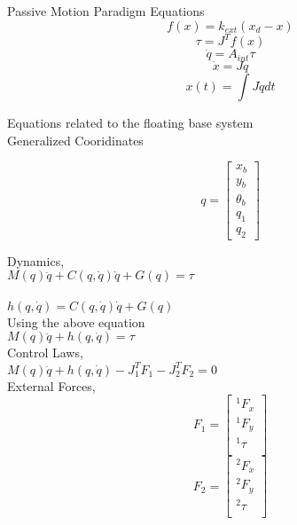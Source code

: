 \documentclass[14pt,a4paper,final]{article}
\begin{document}
Passive Motion Paradigm Equations\\
\begin{equation}
f(x)=k_{ext}(x_d-x)
\end{equation}
\begin{equation}
\tau=J^Tf(x)
\end{equation}
\begin{equation}
\dot{q}=A_{int}\tau
\end{equation}
\begin{equation}
\dot{x}=J\dot{q}
\end{equation}
\begin{equation}
x(t)=\int J \dot{q} dt
\end{equation}

Equations related to the floating base system\\
Generalized Cooridinates

\[q = \begin{bmatrix}
x_b \\
y_b \\
\theta_b \\
q_1 \\
q_2
\end{bmatrix}
\]

Dynamics, \\

$ M(q)\ddot{q}+C(q,\dot{q})\dot{q}+G(q) = \tau $ \\
\\
$h(q,\dot{q})=C(q,\dot{q})\dot{q}+G(q)$ \\ 
Using the above equation \\
$ M(q)\ddot{q}+h(q,\dot{q}) = \tau $ \\
Control Laws, \\

$ M(q)\ddot{q}+h(q,\dot{q}) - J_1^TF_1 -J_2^TF_2 = 0 $ \\

External Forces, \\

\[F_1 = \begin{bmatrix}
^{1}F_x \\
^{1}F_y \\
^{1}\tau \\
\end{bmatrix}
\]
\[F_2 = \begin{bmatrix}
^{2}F_x \\
^{2}F_y \\
^{2}\tau \\
\end{bmatrix}
\]
\end{document}
